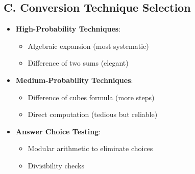 \documentclass[12pt]{article}
\begin{document}
\begin{tacticalbox}
\subsection*{C. Conversion Technique Selection}
\begin{itemize}[leftmargin=*]
    \item \textbf{High-Probability Techniques}:
    \begin{itemize}
        \item Algebraic expansion (most systematic)
        \item Difference of two sums (elegant)
    \end{itemize}
    \item \textbf{Medium-Probability Techniques}:
    \begin{itemize}
        \item Difference of cubes formula (more steps)
        \item Direct computation (tedious but reliable)
    \end{itemize}
    \item \textbf{Answer Choice Testing}:
    \begin{itemize}
        \item Modular arithmetic to eliminate choices
        \item Divisibility checks
    \end{itemize}
\end{itemize}
\end{tacticalbox}
\end{document}
